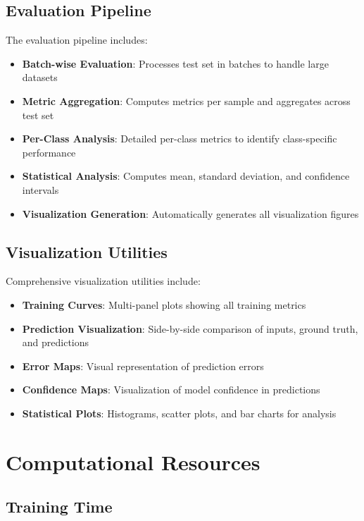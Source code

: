 \documentclass[12pt,a4paper]{article}
\begin{document}
\subsection{Evaluation Pipeline}

The evaluation pipeline includes:

\begin{itemize}
    \item \textbf{Batch-wise Evaluation}: Processes test set in batches to handle large datasets
    \item \textbf{Metric Aggregation}: Computes metrics per sample and aggregates across test set
    \item \textbf{Per-Class Analysis}: Detailed per-class metrics to identify class-specific performance
    \item \textbf{Statistical Analysis}: Computes mean, standard deviation, and confidence intervals
    \item \textbf{Visualization Generation}: Automatically generates all visualization figures
\end{itemize}

\subsection{Visualization Utilities}

Comprehensive visualization utilities include:

\begin{itemize}
    \item \textbf{Training Curves}: Multi-panel plots showing all training metrics
    \item \textbf{Prediction Visualization}: Side-by-side comparison of inputs, ground truth, and predictions
    \item \textbf{Error Maps}: Visual representation of prediction errors
    \item \textbf{Confidence Maps}: Visualization of model confidence in predictions
    \item \textbf{Statistical Plots}: Histograms, scatter plots, and bar charts for analysis
\end{itemize}

\section{Computational Resources}

\subsection{Training Time}
\end{document}
